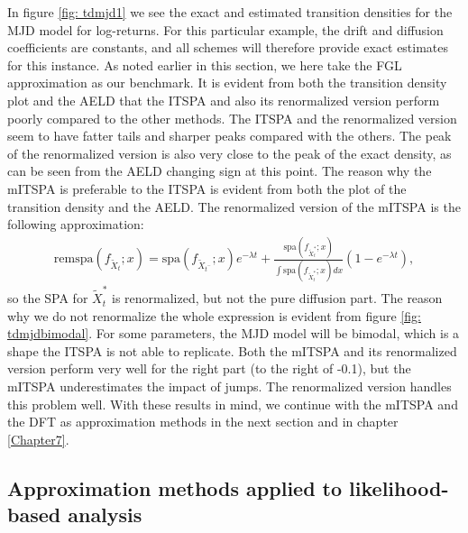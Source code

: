 In figure %
\ref{fig: tdmjd1}
we see the exact and estimated transition densities for the MJD model for log-returns.
For this particular example, the drift and diffusion coefficients are constants, and all schemes will therefore provide exact estimates for this instance.
As noted earlier in this section, we here take the FGL approximation as our benchmark.
It is evident from both the transition density plot and the AELD that the ITSPA and also its renormalized version perform poorly compared to the other methods.
The ITSPA and the renormalized version seem to have fatter tails and sharper peaks compared with the others.
The peak of the renormalized version is also very close to the peak of the exact density, as can be seen from the AELD changing sign at this point.
The reason why the mITSPA is preferable to the ITSPA is evident from both the plot of the transition density and the AELD.
The renormalized version of the mITSPA is the following approximation:
\begin{align}
\text{remspa}\left(f_{\widetilde{X}_t};x\right) = \text{spa}\left(f_{\widetilde{X}_{t^-}};x\right)e^{-\lambda t} + 
\frac{	\text{spa}\left(f_{\widetilde{X}_t^*};x\right)}{\int 	\text{spa}\left(f_{\widetilde{X}_t^*};x\right) dx}
\left(1-e^{-\lambda t}\right),
\end{align}
so the SPA for $\widetilde{X}_{t}^*$ is renormalized, but not the pure diffusion part.
The reason why we do not renormalize the whole expression is evident from figure \ref{fig: tdmjdbimodal}.
For some parameters, the MJD model will be bimodal, which is a shape the ITSPA is not able to replicate.
Both the mITSPA and its renormalized version perform very well for the right part (to the right of -0.1),
but the mITSPA underestimates the impact of jumps.
The renormalized version handles this problem well.
With these results in mind, we continue with the mITSPA and the DFT as approximation methods in the next section and in chapter \ref{Chapter7}.




\subsection{Approximation methods applied to likelihood-based analysis}
\label{Chap6 sec: approximation methods applied to likelihood-based analysis}


